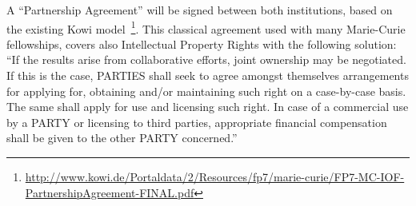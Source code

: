 A ``Partnership  Agreement'' will  be signed between  both institutions,
based on the existing Kowi model~\footnote{\url{http://www.kowi.de/Portaldata/2/Resources/fp7/marie-curie/FP7-MC-IOF-PartnershipAgreement-FINAL.pdf}}. This classical  agreement used  with many  Marie-Curie  fellowships, covers
also   Intellectual   Property   Rights   with  the   following
solution: ``If  the  results arise  from  collaborative efforts,  joint
ownership may be  negotiated. If this is the  case, PARTIES shall seek
to agree  amongst themselves arrangements for  applying for, obtaining
and/or maintaining such right on  a case-by-case basis. The same shall
apply for use and licensing such right. In case of a commercial use by
a  PARTY   or  licensing  to  third   parties,  appropriate  financial
compensation shall be given to the other PARTY concerned.''
\begin{table}[h!]
  \begin{Timeplan}
    \hline
    \hline
    \hline
    
    \hline
    \hline
    \hline
    \hline
    
    \hline
    \hline
    \hline
    \hline
    

\end{Timeplan}
\end{table}
